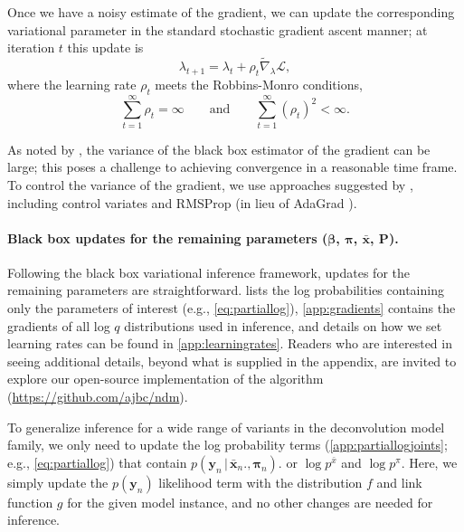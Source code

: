 \documentclass[twoside,11pt]{article}
\newcommand{\g}{\, | \,}
\begin{document}
Once we have a noisy estimate of the gradient, we can update the corresponding variational parameter in the standard stochastic gradient ascent manner; at iteration $t$ this update is
\begin{equation}
    \lambda_{t+1} = \lambda_t + \rho_t \tilde\nabla_{\lambda} \mathcal{L},
    \label{eq:lambdaupdate}
\end{equation}
where the learning rate $\rho_t$ meets the Robbins-Monro conditions,
\begin{equation}
    \sum_{t=1}^\infty \rho_t = \infty \qquad
    \mbox{and} \qquad
    \sum_{t=1}^\infty (\rho_t)^2 < \infty.
\end{equation}

As noted by \citet{Ranganath:2015}, the variance of the black box estimator of the gradient can be large; this poses a challenge to achieving convergence in a reasonable time frame.  To control the variance of the gradient, we use approaches suggested by \citet{Ranganath:2015}, including control variates and RMSProp \citep{tieleman2012lecture} (in lieu of AdaGrad \citep{duchi2011adaptive}).

\paragraph{Black box updates for the remaining parameters ($\boldsymbol{\beta}$, $\boldsymbol{\pi}$, $\boldsymbol{\bar{x}}$,  $\boldsymbol{P}$).}
Following the black box variational inference framework, updates for the remaining parameters are straightforward.   lists the log probabilities containing only the parameters of interest (e.g., \cref{eq:partiallog}),  \cref{app:gradients} contains the gradients of all log $q$ distributions used in inference, and details on how we set learning rates can be found in \cref{app:learningrates}.
Readers who are interested in seeing additional details, beyond what is supplied in the appendix, are invited to explore our open-source implementation of the algorithm (\url{https://github.com/ajbc/ndm}).

To generalize inference for a wide range of variants in the deconvolution model family, we only need to update the log probability terms (\cref{app:partiallogjoints}; e.g., \cref{eq:partiallog}) that contain $p(\boldsymbol{y}_{n} \g \boldsymbol{\bar{x}}_{n}., \boldsymbol{\pi}_n)$. or $\log p^{\bar{x}}$ and $\log p^{\pi}$.  Here, we simply update the $p(\boldsymbol{y}_{n})$ likelihood term with the distribution $f$ and link function $g$ for the given model instance, and no other changes are needed for inference.
\end{document}
